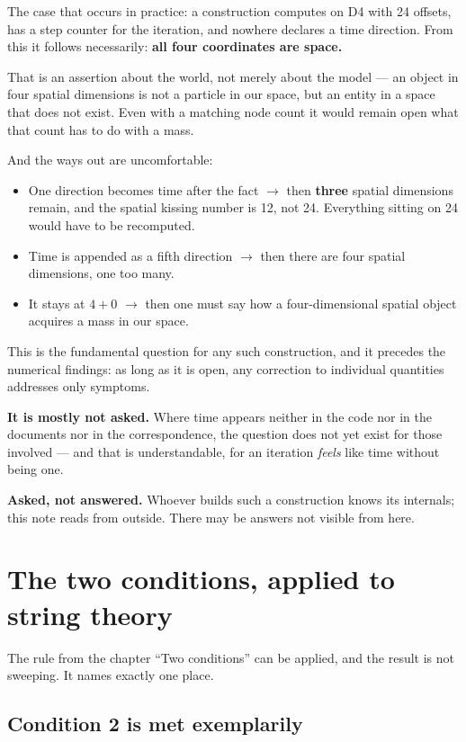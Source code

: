 The case that occurs in practice: a construction computes on D4 with 24
offsets, has a step counter for the iteration, and nowhere declares a
time direction. From this it follows necessarily: \textbf{all four
coordinates are space.}

That is an assertion about the world, not merely about the model --- an
object in four spatial dimensions is not a particle in our space, but
an entity in a space that does not exist. Even with a matching node
count it would remain open what that count has to do with a mass.

And the ways out are uncomfortable:
\begin{itemize}
\item One direction becomes time after the fact $\to$ then
  \textbf{three} spatial dimensions remain, and the spatial kissing
  number is 12, not 24. Everything sitting on 24 would have to be
  recomputed.
\item Time is appended as a fifth direction $\to$ then there are four
  spatial dimensions, one too many.
\item It stays at $4+0$ $\to$ then one must say how a four-dimensional
  spatial object acquires a mass in our space.
\end{itemize}

This is the fundamental question for any such construction, and it
precedes the numerical findings: as long as it is open, any correction
to individual quantities addresses only symptoms.

\textbf{It is mostly not asked.} Where time appears neither in the code
nor in the documents nor in the correspondence, the question does not
yet exist for those involved --- and that is understandable, for an
iteration \emph{feels} like time without being one.

\textbf{Asked, not answered.} Whoever builds such a construction knows
its internals; this note reads from outside. There may be answers not
visible from here.

\chapter{The two conditions, applied to string theory}

The rule from the chapter \enquote{Two conditions} can be applied, and
the result is not sweeping. It names exactly one place.

\section{Condition 2 is met exemplarily}

